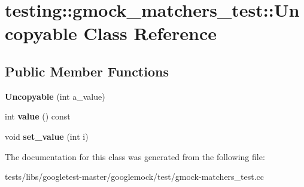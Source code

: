 \hypertarget{classtesting_1_1gmock__matchers__test_1_1Uncopyable}{}\section{testing\+:\+:gmock\+\_\+matchers\+\_\+test\+:\+:Uncopyable Class Reference}
\label{classtesting_1_1gmock__matchers__test_1_1Uncopyable}
\subsection*{Public Member Functions}
\begin{DoxyCompactItemize}
\item 
\mbox{\label{classtesting_1_1gmock__matchers__test_1_1Uncopyable_a827c1de4fe4c2e40791dd87a13972bc7}} 
{\bfseries Uncopyable} (int a\+\_\+value)
\item 
\mbox{\label{classtesting_1_1gmock__matchers__test_1_1Uncopyable_a23512131b948e40ded06555848829866}} 
int {\bfseries value} () const
\item 
\mbox{\label{classtesting_1_1gmock__matchers__test_1_1Uncopyable_a3f30b54f22caac3aa7e6fb79012dc52f}} 
void {\bfseries set\+\_\+value} (int i)
\end{DoxyCompactItemize}


The documentation for this class was generated from the following file\+:\begin{DoxyCompactItemize}
\item 
tests/libs/googletest-\/master/googlemock/test/gmock-\/matchers\+\_\+test.\+cc\end{DoxyCompactItemize}
